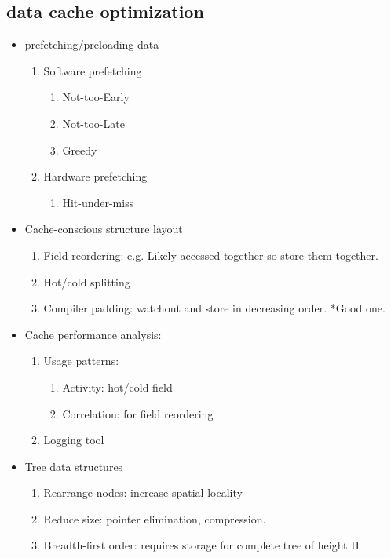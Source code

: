 \documentclass[a4paper]{article}
\begin{document}
\subsection{data cache optimization}
\begin{itemize}
   \item prefetching/preloading data
   \begin{enumerate}
      \item Software prefetching
      \begin{enumerate}
	 \item Not-too-Early
	 \item Not-too-Late
	 \item Greedy
      \end{enumerate}
      \item Hardware prefetching
      \begin{enumerate}
	 \item Hit-under-miss
      \end{enumerate}
   \end{enumerate}
   \item Cache-conscious structure layout
   \begin{enumerate}
	\item Field reordering: e.g. Likely accessed together so store them together.
	\item Hot/cold splitting
	\item Compiler padding: watchout and store in decreasing order. *Good one.
   \end{enumerate}
   \item Cache performance analysis: 
   \begin{enumerate}
	\item Usage patterns:
	    \begin{enumerate}
		\item Activity: hot/cold field
		\item Correlation: for field reordering
	    \end{enumerate}
	\item Logging tool
   \end{enumerate}
   \item Tree data structures
   \begin{enumerate}
	\item Rearrange nodes: increase spatial locality
	\item Reduce size: pointer elimination, compression.
	\item Breadth-first order: requires storage for complete tree of height H

\end{enumerate}
\end{itemize}
\end{document}
